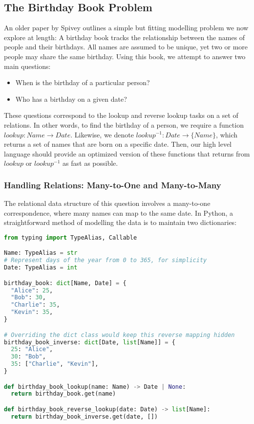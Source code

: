 \documentclass{article}
\begin{document}
\subsection{The Birthday Book Problem}

An older paper by Spivey \cite{spivey1989birthday} outlines a simple but fitting modelling problem we now explore at length: A birthday book tracks the relationship between the names of people and their birthdays. All names are assumed to be unique, yet two or more people may share the same birthday. Using this book, we attempt to answer two main questions:
\begin{itemize}
  \item When is the birthday of a particular person?
  \item Who has a birthday on a given date?
\end{itemize}
These questions correspond to the lookup and reverse lookup tasks on a set of relations. In other words, to find the birthday of a person, we require a function $lookup: Name \rightarrow Date$. Likewise, we denote $lookup^{-1}: Date \rightarrow \{Name\}$, which returns a set of names that are born on a specific date. Then, our high level language should provide an optimized version of these functions that returns from $lookup$ or $lookup^{-1}$ as fast as possible.

\subsubsection{Handling Relations: Many-to-One and Many-to-Many}

The relational data structure of this question involves a many-to-one correspondence, where many names can map to the same date. In Python, a straightforward method of modelling the data is to maintain two dictionaries:

\begin{lstlisting}[language=python]
from typing import TypeAlias, Callable

Name: TypeAlias = str
# Represent days of the year from 0 to 365, for simplicity
Date: TypeAlias = int

birthday_book: dict[Name, Date] = {
  "Alice": 25,
  "Bob": 30,
  "Charlie": 35,
  "Kevin": 35,
}

# Overriding the dict class would keep this reverse mapping hidden
birthday_book_inverse: dict[Date, list[Name]] = {
  25: "Alice",
  30: "Bob",
  35: ["Charlie", "Kevin"],
}

def birthday_book_lookup(name: Name) -> Date | None:
  return birthday_book.get(name)

def birthday_book_reverse_lookup(date: Date) -> list[Name]:
  return birthday_book_inverse.get(date, [])
\end{lstlisting}
\end{document}
